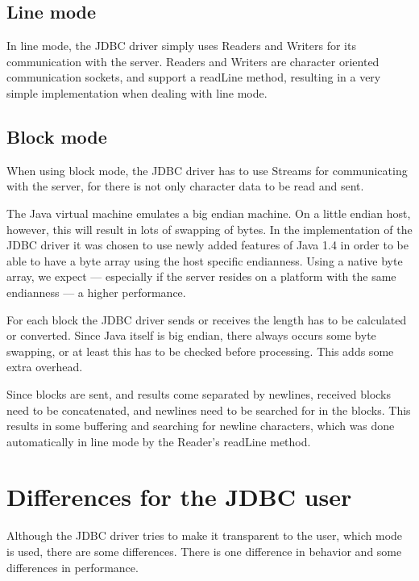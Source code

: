 \documentclass{article}
\begin{document}
\subsection{Line mode}

In line mode, the JDBC driver simply uses \textsf{Reader}s and
\textsf{Writer}s for its communication with the server. \textsf{Reader}s
and \textsf{Writer}s are character oriented communication sockets,
and support a \textsf{readLine} method, resulting in a very
simple implementation when dealing with line mode.


\subsection{Block mode}

When using block mode, the JDBC driver has to use \textsf{Stream}s
for communicating with the server, for there is not only character data
to be read and sent.

The Java virtual machine emulates a big endian machine. On a little
endian host, however, this will result in lots of swapping of bytes.
In the implementation of the JDBC driver it was chosen to use newly
added features of Java 1.4 in order to be able to have a byte array
using the host specific endianness. Using a native byte array, we
expect --- especially if the server resides on a platform with the same
endianness --- a higher performance.

For each block the JDBC driver sends or receives the length has
to be calculated or converted. Since Java itself is big endian, there
always occurs some byte swapping, or at least this has to be checked
before processing. This adds some extra overhead.

Since blocks are sent, and results come separated by newlines,
received blocks need to be concatenated, and newlines need to be
searched for in the blocks. This results in some buffering and
searching for newline characters, which was done automatically
in line mode by the \textsf{Reader}'s \textsf{readLine} method.


\section{Differences for the JDBC user}

Although the JDBC driver tries to make it transparent to the user, which
mode is used, there are some differences. There is one difference in
behavior and some differences in performance.
\end{document}
